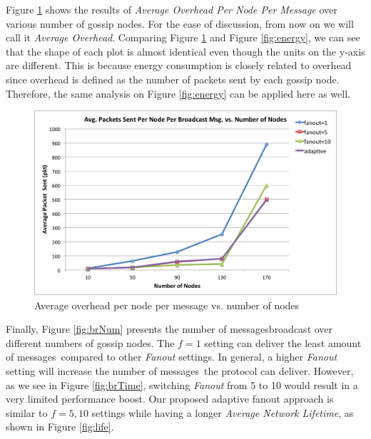 \documentclass[onehalf,11pt]{beavtex}
\newcommand{\msgs}{messages}
\newcommand{\gn}{gossip node}
\newcommand{\gns}{gossip nodes}
\newcommand{\anl}{Average Network Lifetime}
\newcommand{\ao}{Average Overhead}
\begin{document}
Figure \ref{fig:overhead} shows the results of \emph{Average Overhead Per Node Per Message} over various number of \gns. For the ease of discussion, from now on we will call it \emph{\ao}. Comparing Figure \ref{fig:overhead} and Figure \ref{fig:energy}, we can see that the shape of each plot is almost identical even though the units on the y-axis are different. This is because energy consumption is closely related to overhead since overhead is defined as the number of packets sent by each \gn. Therefore, the same analysis on Figure \ref{fig:energy} can be applied here as well.

\begin{figure} 
	\centering
	\includegraphics[width=5.5in]{overhead.png}
	\caption{Average overhead per node per message vs. number of nodes}
	\label{fig:overhead}
\end{figure}

Finally, Figure \ref{fig:brNum} presents the number of \msgs broadcast over different numbers of \gns. The $f=1$ setting can deliver the least amount of \msgs ~compared to other \emph{Fanout} settings. In general, a higher \emph{Fanout} setting will increase the number of \msgs ~the protocol can deliver. However, as we see in Figure \ref{fig:brTime}, switching \emph{Fanout} from 5 to 10 would result in a very limited performance boost. Our proposed adaptive fanout approach is similar to $f=5,10$ settings while having a longer \emph{\anl}, as shown in Figure \ref{fig:life}.
\end{document}

